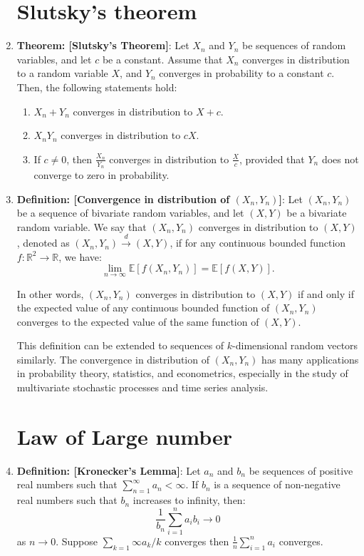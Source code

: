 \documentclass[12pt,oneside]{book}
\begin{document}
\begin{enumerate}
\section{Slutsky's theorem} 
\item  \textbf{Theorem: [Slutsky's Theorem]}: Let $X_n$ and $Y_n$ be sequences of random variables, and let $c$ be a constant. Assume that $X_n$ converges in distribution to a random variable $X$, and $Y_n$ converges in probability to a constant $c$. Then, the following statements hold:
\begin{enumerate}
    \item $X_n + Y_n$ converges in distribution to $X+c$.
    \item $X_n Y_n$ converges in distribution to $cX$.
    \item If $c\neq 0$, then $\frac{X_n}{Y_n}$ converges in distribution to $\frac{X}{c}$, provided that $Y_n$ does not converge to zero in probability.
\end{enumerate}
\item \textbf{Definition: [Convergence in distribution of $(X_n,Y_n)$]}: Let $(X_n, Y_n)$ be a sequence of bivariate random variables, and let $(X, Y)$ be a bivariate random variable. We say that $(X_n, Y_n)$ converges in distribution to $(X, Y)$, denoted as $(X_n, Y_n) \xrightarrow{d} (X, Y)$, if for any continuous bounded function $f: \mathbb{R}^2 \rightarrow \mathbb{R}$, we have:
\begin{equation*}
\lim_{n \rightarrow \infty} \mathbb{E}[f(X_n, Y_n)] = \mathbb{E}[f(X, Y)].
\end{equation*}

In other words, $(X_n, Y_n)$ converges in distribution to $(X, Y)$ if and only if the expected value of any continuous bounded function of $(X_n, Y_n)$ converges to the expected value of the same function of $(X, Y)$.

This definition can be extended to sequences of $k$-dimensional random vectors similarly. The convergence in distribution of $(X_n, Y_n)$ has many applications in probability theory, statistics, and econometrics, especially in the study of multivariate stochastic processes and time series analysis.
\section{Law of Large number}
\item \textbf{Definition: [Kronecker's Lemma]}:  Let ${a_n}$ and ${b_n}$ be sequences of positive real numbers such that $\sum_{n=1}^\infty a_n < \infty$. If ${b_n}$ is a sequence of non-negative real numbers such that $b_n$ increases to infinity, then:
$$\frac{1}{b_n}\sum_{i=1}^na_ib_i\to 0$$
as $n\to 0$. Suppose $\sum_{k=1}\infty a_k/k$ converges then $\frac{1}{n}\sum_{i=1}^na_i$ converges. 


\end{enumerate}
\end{document}
